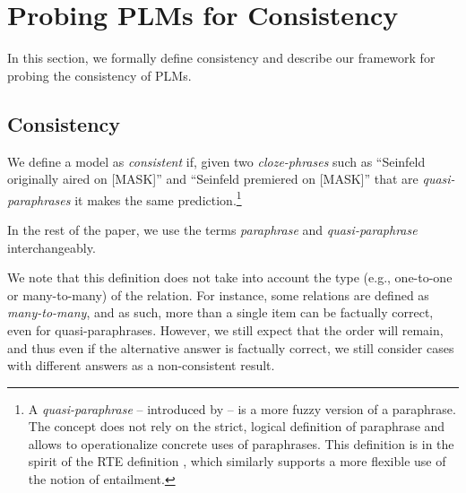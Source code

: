 \section{Probing PLMs for Consistency}
\label{sec:probe}

In this section, we formally define consistency and describe
our framework for probing the consistency of PLMs.

\subsection{Consistency}
We define a model as \emph{consistent} if, given  two
\textit{cloze-phrases} such as 
 ``Seinfeld originally aired on [MASK]'' and
``Seinfeld premiered on [MASK]'' that
are \textit{quasi-paraphrases} it makes the same
prediction.\footnote{A \textit{quasi-paraphrase} --
  introduced by \citet{what_is_paraphrase} -- is a more
  fuzzy version of a paraphrase. The concept does not rely
  on the strict, logical definition of paraphrase and
  allows to operationalize concrete uses of
  paraphrases. This definition is in the spirit of the RTE
  definition \cite{dagan-rte}, which similarly supports a
  more flexible use of the notion of entailment.}
  
In the rest of the paper, we use the terms \textit{paraphrase} and \textit{quasi-paraphrase} interchangeably.

 
We note that this definition does not take into account the type (e.g., one-to-one or many-to-many) of the relation. %
For instance, some relations are defined as \textit{many-to-many}, and as such, more than a single item can be factually correct, even for quasi-paraphrases. However, we still expect that the order will remain, and thus even if the alternative answer is factually correct, we still consider cases with different answers as a non-consistent result.

